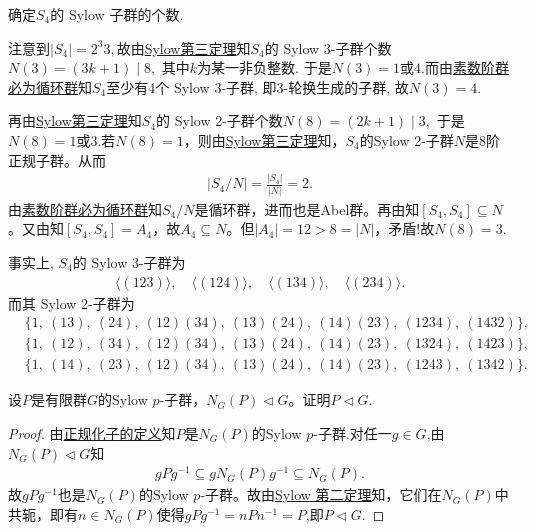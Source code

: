 \documentclass[../../main.tex]{subfiles}%
\begin{document}
\begin{example}\label{example:S4的Sylow子群}
确定$S_4$的 Sylow 子群的个数.
\end{example}
\begin{solution}

注意到$|S_4| = 2^3 3,$故由\hyperref[theorem:Sylow第三定理]{Sylow第三定理}知$S_4$的 Sylow 3-子群个数$N(3) = (3k + 1) \mid 8,$ 其中$k$为某一非负整数. 于是$N(3)=1$或$4$.而由\hyperref[proposition:素数阶群必为循环群]{素数阶群必为循环群}知$S_4$至少有4个 Sylow 3-子群, 即3-轮换生成的子群, 故$N(3) = 4.$ 

再由\hyperref[theorem:Sylow第三定理]{Sylow第三定理}知$S_4$的 Sylow 2-子群个数$N(8) = (2k + 1) \mid 3,$ 于是$N(8)=1$或$3$.若$N(8)=1$，则由\hyperref[theorem:Sylow第三定理]{Sylow第三定理}知，$S_4$的Sylow 2-子群$N$是8阶正规子群。从而\begin{align*}
|S_4/N|=\frac{|S_4|}{|N|}=2.
\end{align*}
由\hyperref[proposition:素数阶群必为循环群]{素数阶群必为循环群}知$S_4/N$是循环群，进而也是Abel群。再由知$[S_4,S_4]\subseteq N$。又由知$[S_4,S_4]=A_4$，故$A_4\subseteq N$。但$|A_4|=12>8=|N|$，矛盾!故$N(8) = 3.$

事实上, $S_4$的 Sylow 3-子群为
\begin{align*}
\langle (123) \rangle, \quad \langle (124) \rangle, \quad \langle (134) \rangle, \quad \langle (234) \rangle.
\end{align*}
而其 Sylow 2-子群为
\begin{align*}
& \{1,\ (13),\ (24),\ (12)(34),\ (13)(24),\ (14)(23),\ (1234),\ (1432)\}, \\
& \{1,\ (12),\ (34),\ (12)(34),\ (13)(24),\ (14)(23),\ (1324),\ (1423)\}, \\
& \{1,\ (14),\ (23),\ (12)(34),\ (13)(24),\ (14)(23),\ (1243),\ (1342)\}.
\end{align*}

\end{solution}

\begin{example}
设$P$是有限群$G$的Sylow $p$-子群，$N_G(P)\lhd G$。证明$P\lhd G$.
\end{example}
\begin{proof}

由\hyperref[theorem:共轭子群和正规化子]{正规化子的定义}知$P$是$N_G(P)$的Sylow $p$-子群.对任一$g\in G$,由$N_G(P)\lhd G$知
\begin{align*}
gPg^{-1}\subseteq gN_G(P)g^{-1}\subseteq N_G(P).
\end{align*}
故$gPg^{-1}$也是$N_G(P)$的Sylow $p$-子群。故由\hyperref[theorem:Sylow 第二定理]{Sylow 第二定理}知，它们在$N_G(P)$中共轭，即有$n\in N_G(P)$使得$gPg^{-1}=nPn^{-1}=P$,即$P\lhd G$.

\end{proof}
\end{document}
